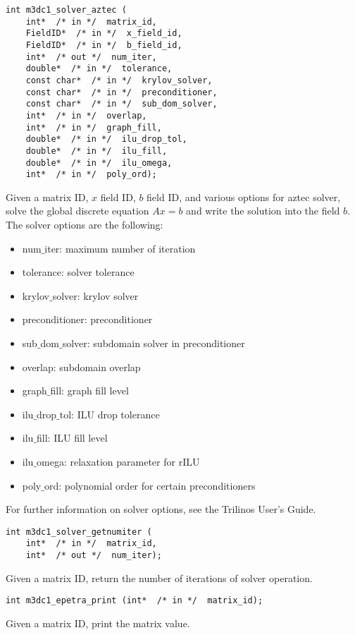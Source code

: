 \begin{verbatim}
int m3dc1_solver_aztec ( 
    int*  /* in */  matrix_id, 
    FieldID*  /* in */  x_field_id, 
    FieldID*  /* in */  b_field_id, 
    int*  /* out */  num_iter, 
    double*  /* in */  tolerance,
    const char*  /* in */  krylov_solver, 
    const char*  /* in */  preconditioner, 
    const char*  /* in */  sub_dom_solver,
    int*  /* in */  overlap, 
    int*  /* in */  graph_fill, 
    double*  /* in */  ilu_drop_tol,  
    double*  /* in */  ilu_fill,
    double*  /* in */  ilu_omega, 
    int*  /* in */  poly_ord);
\end{verbatim}\vspace{-.5cm}\hspace{1cm}
Given a matrix ID, $x$ field ID, $b$ field ID, and various options for aztec solver, solve the global discrete equation $Ax=b$ and write the solution into the field $b$. The solver options are the following:
\begin{itemize}
\item num$\_$iter: maximum number of iteration
\item tolerance: solver tolerance
\item krylov$\_$solver: krylov solver
\item preconditioner: preconditioner
\item sub$\_$dom$\_$solver: subdomain solver in preconditioner
\item overlap: subdomain overlap
\item graph$\_$fill: graph fill level
\item ilu$\_$drop$\_$tol: ILU drop tolerance
\item ilu$\_$fill: ILU fill level
\item ilu$\_$omega: relaxation parameter for rILU
\item poly$\_$ord: polynomial order for certain preconditioners
\end{itemize}

For further information on solver options, see the Trilinos User's Guide.

\begin{verbatim}
int m3dc1_solver_getnumiter (
    int*  /* in */  matrix_id, 
    int*  /* out */  num_iter);
\end{verbatim}\vspace{-.5cm}\hspace{1cm}
Given a matrix ID, return the number of iterations of solver operation.

\begin{verbatim}
int m3dc1_epetra_print (int*  /* in */  matrix_id);
\end{verbatim}\vspace{-.5cm}\hspace{1cm}
Given a matrix ID, print the matrix value.

